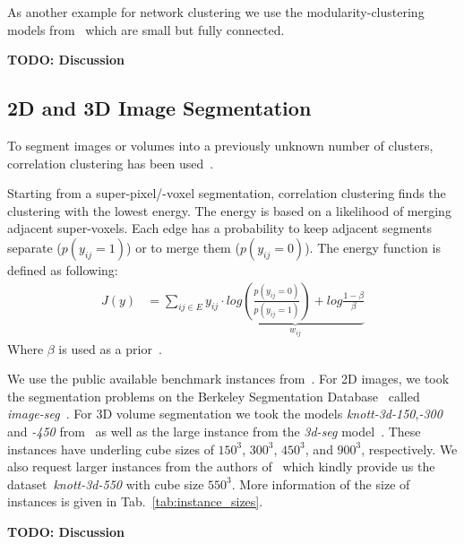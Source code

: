 \documentclass[10pt,twocolumn,letterpaper]{article}
\theoremstyle{definition}
\begin{document}
As another example for network clustering we use the modularity-clustering models from~\cite{kappes_2014_benchmark_arxiv} which are small but fully connected.

{\color{red}\textbf{TODO: Discussion}}



\subsection{2D and 3D Image Segmentation}
To segment images or volumes into a previously
unknown number of clusters, correlation clustering
has been used~\cite{andres_2011_iccv,kroeger_2012_eccv}.

Starting from a super-pixel/-voxel segmentation,
correlation clustering finds the clustering with the lowest energy.
The energy is based on a likelihood of merging adjacent super-voxels.
Each edge has a probability to keep adjacent segments separate ($p(y_{ij} =1)$)
or to merge them ($p(y_{ij} = 0)$).
The energy function is defined as following:
\begin{align}
 J(y)  &= \sum_{ij \in E} y_{ij}\cdot \underbrace{  log\left( \frac{p(y_{ij} =0)}{p(y_{ij} =1)}\right) + log \frac{1-\beta}{\beta}  }_{w_{ij}}
\end{align}
Where $\beta$ is used as a prior~\cite{andres_2011_iccv}.

We use the public available benchmark instances from~\cite{kappes_2013_benchmark_cvpr,kappes_2014_benchmark_arxiv}.
For 2D images, we took the segmentation problems on the Berkeley Segmentation Database~\cite{martin_2001} called \emph{image-seg}~\cite{andres_2011_iccv,kappes_2013_benchmark_cvpr}.
For 3D volume segmentation we took the models \emph{knott-3d-150},\emph{-300} and \emph{-450} from~\cite{kroeger_2012_eccv,kappes_2014_benchmark_arxiv} as well as the large
instance from the \emph{3d-seg} model~\cite{andres_2011_iccv,kappes_2013_benchmark_cvpr}. These instances have underling cube sizes of  $150^3$, $300^3$, $450^3$, and $900^3$, respectively.
We also request larger instances from the authors of~\cite{kroeger_2012_eccv} which kindly provide us the dataset~\emph{knott-3d-550} with cube size  $550^3$.
More information of the size of instances is given in Tab.~\ref{tab:instance_sizes}.

{\color{red}\textbf{TODO: Discussion}}
\end{document}
